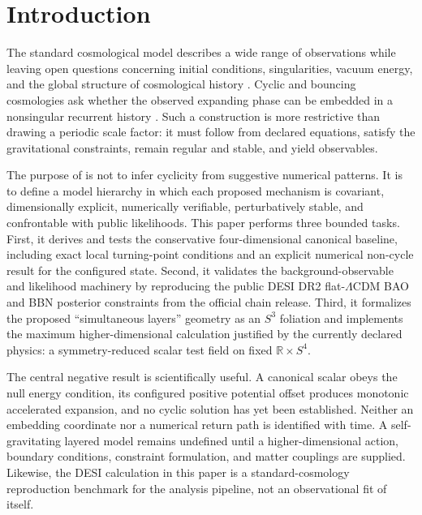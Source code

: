 \section{Introduction}
The standard cosmological model describes a wide range of observations while leaving open questions concerning initial conditions, singularities, vacuum energy, and the global structure of cosmological history \cite{planck2018,desi2025dr2}. Cyclic and bouncing cosmologies ask whether the observed expanding phase can be embedded in a nonsingular recurrent history \cite{ashtekar2011,lehners2008}. Such a construction is more restrictive than drawing a periodic scale factor: it must follow from declared equations, satisfy the gravitational constraints, remain regular and stable, and yield observables.

The purpose of \SCPC{} is not to infer cyclicity from suggestive numerical patterns. It is to define a model hierarchy in which each proposed mechanism is covariant, dimensionally explicit, numerically verifiable, perturbatively stable, and confrontable with public likelihoods. This paper performs three bounded tasks. First, it derives and tests the conservative four-dimensional canonical baseline, including exact local turning-point conditions and an explicit numerical non-cycle result for the configured state. Second, it validates the background-observable and likelihood machinery by reproducing the public DESI DR2 flat-$\Lambda$CDM BAO and BBN posterior constraints from the official chain release. Third, it formalizes the proposed ``simultaneous layers'' geometry as an $S^3$ foliation and implements the maximum higher-dimensional calculation justified by the currently declared physics: a symmetry-reduced scalar test field on fixed $\mathbb R\times S^4$.

The central negative result is scientifically useful. A canonical scalar obeys the null energy condition, its configured positive potential offset produces monotonic accelerated expansion, and no cyclic solution has yet been established. Neither an embedding coordinate nor a numerical return path is identified with time. A self-gravitating layered model remains undefined until a higher-dimensional action, boundary conditions, constraint formulation, and matter couplings are supplied. Likewise, the DESI calculation in this paper is a standard-cosmology reproduction benchmark for the analysis pipeline, not an observational fit of \SCPC{} itself.
